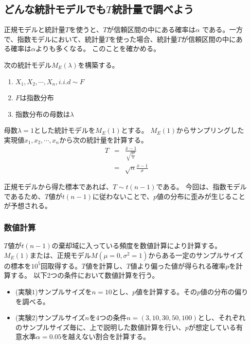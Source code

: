 \subsection{どんな統計モデルでも$T$統計量で調べよう}
正規モデルと統計量$T$を使うと、$T$が信頼区間の中にある確率は$\alpha$ である。一方で、指数モデルにおいて、統計量$T$を使った場合、統計量$T$が信頼区間の中にある確率は$\alpha$よりも多くなる。
このことを確かめる。

次の統計モデル$M_E(\lambda)$を構築する。
\begin{enumerate}
    \item $X_1,X_2,\cdots,X_n ,i.i.d\sim F$
    \item $F$は指数分布
    \item 指数分布の母数は$\lambda$
\end{enumerate}
母数$\lambda=1$とした統計モデルを$M_E(1)$とする。
$M_E(1)$からサンプリングした実現値$x_1,x_2,\cdots,x_n$から次の統計量を計算する。
\begin{eqnarray*}
    T &=& \frac{\bar{x}-1}{\sqrt{\frac{\sigma^2}{n}}} \\
 &=& \sqrt{n}\frac{\bar{x}-1}{\sigma}%
\end{eqnarray*}

正規モデルから得た標本であれば、$T \sim t(n-1)$である。
今回は、指数モデルであるため、$T$値が$t(n-1)$に従わないことで、$p$値の分布に歪みが生じることが予想される。

\subsubsection{数値計算}
$T$値が$t(n-1)$の棄却域に入っている頻度を数値計算により計算する。
$M_E(1)$または、正規モデル$M(\mu=0,\sigma^2=1)$からある一定のサンプルサイズの標本を$10^5$回取得する。$T$値を計算し、$T$値より偏った値が得られる確率$p$を計算する。
以下2つの条件において数値計算を行う。
\begin{itemize}
 \item (実験$1$)サンプルサイズを$n=10$とし、$p$値を計算する。その$p$値の分布の偏りを調べる。
 \item (実験$2$)サンプルサイズ$n$を4つの条件$n=(3,10,30,50,100)$とし、それぞれのサンプルサイズ毎に、上で説明した数値計算を行い、$p$が想定している有意水準$\alpha=0.05$を越えない割合を計算する。%
\end{itemize}

